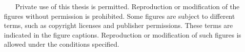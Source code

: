 {%
  \copyrighttext%
  {\copyrightmetastring\ \allrightsreservedeng}%
  {%
    \copyrightstring\ \allrightsreservedeng
    \blockpar
    Private use of this thesis is permitted. Reproduction or
    modification of the figures without permission is prohibited.
    \blockpar
    Some figures are subject to different terms, such as copyright
    licenses and publisher permissions. These terms are indicated in
    the figure captions. Reproduction or modification of such figures
    is allowed under the conditions specified.
  }
}
